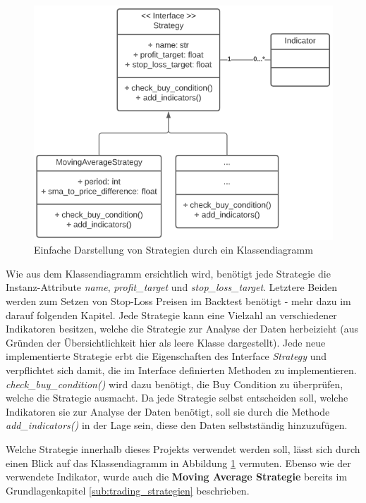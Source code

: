\documentclass[oneside]{ausarbeitung}
\begin{document}
\begin{figure}[H]
  \centering
  \includegraphics[height=0.45\textheight]{uml/strategy_uml.png}
  \caption{Einfache Darstellung von Strategien durch ein Klassendiagramm}
  \label{fig:11}
\end{figure}

Wie aus dem Klassendiagramm ersichtlich wird, benötigt jede Strategie die Instanz-Attribute \textit{name}, \textit{profit\_target} und \textit{stop\_loss\_target}. Letztere Beiden werden zum Setzen von Stop-Loss Preisen im Backtest benötigt - mehr dazu im darauf folgenden Kapitel. Jede Strategie kann eine Vielzahl an verschiedener Indikatoren besitzen, welche die Strategie zur Analyse der Daten herbeizieht (aus Gründen der Übersichtlichkeit hier als leere Klasse dargestellt). Jede neue implementierte Strategie erbt die Eigenschaften des Interface \textit{Strategy} und verpflichtet sich damit, die im Interface definierten Methoden zu implementieren. \textit{check\_buy\_condition()} wird dazu benötigt, die Buy Condition zu überprüfen, welche die Strategie ausmacht. Da jede Strategie selbst entscheiden soll, welche Indikatoren sie zur Analyse der Daten benötigt, soll sie durch die Methode \textit{add\_indicators()} in der Lage sein, diese den Daten selbstständig hinzuzufügen.

Welche Strategie innerhalb dieses Projekts verwendet werden soll, lässt sich durch einen Blick auf das Klassendiagramm in Abbildung \ref{fig:11} vermuten. Ebenso wie der verwendete Indikator, wurde auch die \textbf{Moving Average Strategie} bereits im Grundlagenkapitel \ref{sub:trading_strategien} beschrieben.
\end{document}
